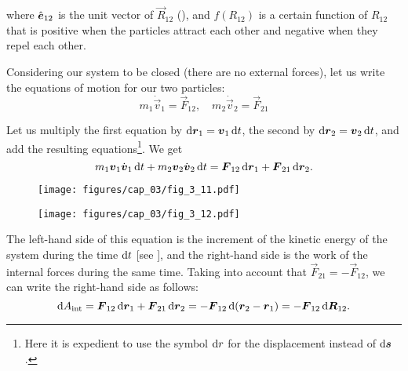 \noindent
where $\hat{\boldsymbol{e}}_{12}$ is the unit vector of $\vec{R}_{12}$ (), and $f(R_{12})$ is a certain function of $R_{12}$ that is positive when the particles attract each other and negative when they repel each other.

Considering our system to be closed (there are no external forces), let us write the equations of motion for our two particles:
\begin{equation*}
m_1\dot{\vec{v}}_1 = \vec{F}_{12},\quad m_2\dot{\vec{v}}_2 = \vec{F}_{21}
\end{equation*}

\noindent
Let us multiply the first equation by $\mathrm{d}\boldsymbol{r}_1=\boldsymbol{v}_1\,\mathrm{d} t$, the second by $\mathrm{d}\boldsymbol{r}_2=\boldsymbol{v}_2\,\mathrm{d} t$, and add the resulting equations\footnote{Here it is expedient to use the symbol $\mathrm{d} r$ for the displacement instead of $\mathrm{d}\boldsymbol{s}$.}. We get
\begin{equation}\label{eq:3_42}
m_1\boldsymbol{v}_1\dot{\boldsymbol{v}}_1\,\mathrm{d} t + m_2\boldsymbol{v}_2\dot{\boldsymbol{v}}_2\,\mathrm{d} t = \boldsymbol{F}_{12}\,\mathrm{d}\boldsymbol{r}_1 + \boldsymbol{F}_{21}\,\mathrm{d}\boldsymbol{r}_2.
\end{equation}

\begin{figure}[t]
	\begin{minipage}[t]{0.5\linewidth}
		\begin{center}
			\texttt{[image: figures/cap\_03/fig\_3\_11.pdf]}
			\caption[]{}
			\label{fig:3_11}
		\end{center}
	\end{minipage}
	\hspace{-0.05cm}
	\begin{minipage}[t]{0.5\linewidth}
		\begin{center}
			\texttt{[image: figures/cap\_03/fig\_3\_12.pdf]}
			\caption[]{}
			\label{fig:3_12}
		\end{center}
	\end{minipage}
\end{figure}

\noindent
The left-hand side of this equation is the increment of the kinetic energy of the system during the time $\mathrm{d} t$ [see ], and the right-hand side is the work of the internal forces during the same time. Taking into account that $\vec{F}_{21}=-\vec{F}_{12}$, we can write the right-hand side as follows:
\begin{equation}\label{eq:3_43}
\mathrm{d} A_{\text{int}} = \boldsymbol{F}_{12}\,\mathrm{d}\boldsymbol{r}_1 + \boldsymbol{F}_{21}\,\mathrm{d}\boldsymbol{r}_2 = -\boldsymbol{F}_{12}\,\mathrm{d}(\boldsymbol{r}_2-\boldsymbol{r}_1) = -\boldsymbol{F}_{12}\,\mathrm{d}\boldsymbol{R}_{12}.
\end{equation}

